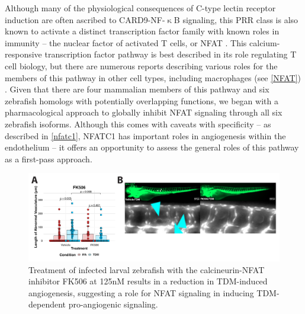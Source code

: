 Although many of the physiological consequences of C-type lectin receptor induction are often ascribed to CARD9-NF-$\upkappa$B signaling, this PRR class is also known to activate a distinct transcription factor family with known roles in immunity -- the nuclear factor of activated T cells, or NFAT \citep{Goodridge2007, Deerhake2021}. This calcium-responsive transcription factor pathway is best described in its role regulating T cell biology, but there are numerous reports describing various roles for the members of this pathway in other cell types, including macrophages (see \autoref{NFAT}) \citep{Symes1998, Jones2000, Crabtree2002, Horsley2002, Elloumi2012}. Given that there are four mammalian members of this pathway and six zebrafish homologs with potentially overlapping functions, we began with a pharmacological approach to globally inhibit NFAT signaling through all six zebrafish isoforms. Although this comes with caveats with specificity -- as described in \autoref{nfatc1}, NFATC1 has important roles in angiogenesis within the endothelium -- it offers an opportunity to assess the general roles of this pathway as a first-pass approach. 

\begin{figure}
\centering
\includegraphics[width=\textwidth]{images/fk506tdm.pdf}
\caption{Treatment of infected larval zebrafish with the calcineurin-NFAT inhibitor FK506 at 125nM results in a reduction in TDM-induced angiogenesis, suggesting a role for NFAT signaling in inducing TDM-dependent pro-angiogenic signaling.}
\label{figure:fk506tdm}
\end{figure}

